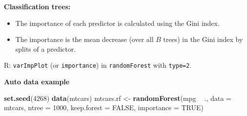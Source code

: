 \documentclass[ignorenonframetext,]{beamer}
\newenvironment{Shaded}{\begin{snugshade}}{\end{snugshade}}
\newcommand{\KeywordTok}[1]{\textcolor[rgb]{0.13,0.29,0.53}{\textbf{#1}}}
\newcommand{\DataTypeTok}[1]{\textcolor[rgb]{0.13,0.29,0.53}{#1}}
\newcommand{\DecValTok}[1]{\textcolor[rgb]{0.00,0.00,0.81}{#1}}
\newcommand{\StringTok}[1]{\textcolor[rgb]{0.31,0.60,0.02}{#1}}
\newcommand{\OtherTok}[1]{\textcolor[rgb]{0.56,0.35,0.01}{#1}}
\newcommand{\OperatorTok}[1]{\textcolor[rgb]{0.81,0.36,0.00}{\textbf{#1}}}
\newcommand{\NormalTok}[1]{#1}
\providecommand{\tightlist}{%
  \setlength{\itemsep}{0pt}\setlength{\parskip}{0pt}}
\begin{document}
\begin{frame}[fragile]

\textbf{Classification trees:}

\begin{itemize}
\tightlist
\item
  The importance of each predictor is calculated using the Gini index.
\item
  The importance is the mean decrease (over all \(B\) trees) in the Gini
  index by splits of a predictor.
\end{itemize}

R: \texttt{varImpPlot} (or \texttt{importance}) in \texttt{randomForest}
with \texttt{type=2}.

\end{frame}

\begin{frame}[fragile]

\textbf{Auto data example}

\begin{Shaded}
\begin{Highlighting}[]
\KeywordTok{set.seed}\NormalTok{(}\DecValTok{4268}\NormalTok{)}
\KeywordTok{data}\NormalTok{(mtcars)}
\NormalTok{mtcars.rf <-}\StringTok{ }\KeywordTok{randomForest}\NormalTok{(mpg }\OperatorTok{~}\StringTok{ }\NormalTok{., }\DataTypeTok{data =}\NormalTok{ mtcars, }\DataTypeTok{ntree =} \DecValTok{1000}\NormalTok{, }\DataTypeTok{keep.forest =} \OtherTok{FALSE}\NormalTok{, }
    \DataTypeTok{importance =} \OtherTok{TRUE}\NormalTok{)}
\end{Highlighting}
\end{Shaded}

\end{frame}
\end{document}
